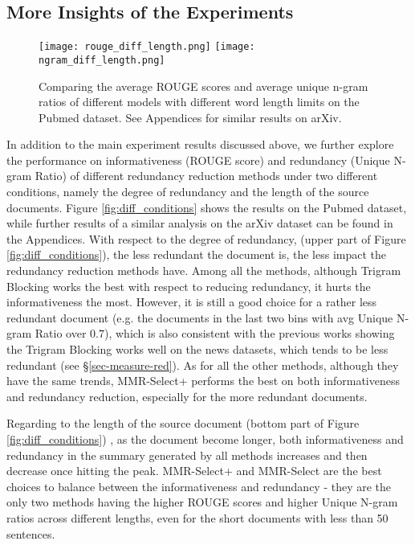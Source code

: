 \documentclass[11pt,a4paper]{article}
\begin{document}
\subsection{More Insights of the Experiments}
\begin{figure}
    \centering
    \texttt{[image: rouge\_diff\_length.png]}
    \texttt{[image: ngram\_diff\_length.png]}
    \caption{Comparing the average ROUGE scores and average unique n-gram ratios of different models with different word length limits on the Pubmed dataset. See Appendices for similar results on arXiv.}
    \label{fig:diff_length}
\end{figure}
In addition to the main experiment results discussed above, we further explore the performance on informativeness (ROUGE score) and redundancy (Unique N-gram Ratio) of different redundancy reduction methods under two different conditions, namely the degree of redundancy and the length of the source documents. Figure \ref{fig:diff_conditions} shows the results on the Pubmed dataset, while further results of a similar analysis on the arXiv dataset can be found in the Appendices. With respect to the degree of redundancy, (upper part of Figure \ref{fig:diff_conditions}), the less redundant the document is, the less impact the redundancy reduction methods have. Among all the methods, although Trigram Blocking works the best with respect to reducing redundancy, it hurts the informativeness the most. However, it is still a good choice for a rather less redundant document (e.g. the documents in the last two bins with avg Unique N-gram Ratio over $0.7$), which is also consistent with the previous works showing the Trigram Blocking works well on the news datasets, which tends to be less redundant (see \S\ref{sec-measure-red}). As for all the other methods, although they have the same trends, MMR-Select+ performs the best on both informativeness and redundancy reduction, especially for the more redundant documents. 

Regarding to the length of the source document (bottom part of Figure \ref{fig:diff_conditions}) , as the document become longer, both informativeness and redundancy in the summary generated by all methods increases and then decrease once hitting the peak. MMR-Select+ and MMR-Select are the best choices to balance between the informativeness and redundancy - they are the only two methods having the higher ROUGE scores and higher Unique N-gram ratios across different lengths, even for the short documents with less than 50 sentences.
\end{document}
